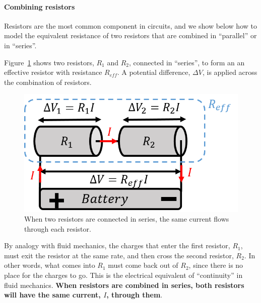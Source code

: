 \paragraph{Combining resistors}

Resistors are the most common component in circuits, and we show below how to model the equivalent resistance of two resistors that are combined in ``parallel'' or in ``series''.

Figure~\ref{fig:current:series} shows two resistors, $R_1$ and $R_2$, connected in ``series'', to form an an effective resistor with resistance $R_{eff}$. A potential difference, $\Delta V$, is applied across the combination of resistors.

\begin{figure}[!htbp]
\centering
\includegraphics[width=0.45\linewidth]{files/series-89b8fcc9f34dfbdec77541ffdf727f64.png}
\caption[]{When two resistors are connected in series, the same current flows through each resistor.}
\label{fig:current:series}
\end{figure}

By analogy with fluid mechanics, the charges that enter the first resistor, $R_1$, must exit the resistor at the same rate, and then cross the second resistor, $R_2$. In other words, what comes into $R_1$ must come back out of $R_2$, since there is no place for the charges to go. This is the electrical equivalent of ``continuity'' in fluid mechanics. \textbf{When resistors are combined in series, both resistors will have the same current, $I$, through them}.

